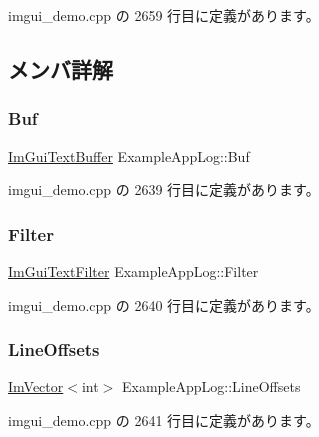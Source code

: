 imgui\+\_\+demo.\+cpp の 2659 行目に定義があります。



\subsection{メンバ詳解}
\mbox{\label{struct_example_app_log_a74fb7cd7bd8c2507b41331ebb7d0e56d}} 
\subsubsection{\texorpdfstring{Buf}{Buf}}
{\footnotesize\ttfamily \mbox{\hyperlink{struct_im_gui_text_buffer}{Im\+Gui\+Text\+Buffer}} Example\+App\+Log\+::\+Buf}



 imgui\+\_\+demo.\+cpp の 2639 行目に定義があります。

\mbox{\label{struct_example_app_log_a4571947a6000e984ec8da9b7166e1e2b}} 
\subsubsection{\texorpdfstring{Filter}{Filter}}
{\footnotesize\ttfamily \mbox{\hyperlink{struct_im_gui_text_filter}{Im\+Gui\+Text\+Filter}} Example\+App\+Log\+::\+Filter}



 imgui\+\_\+demo.\+cpp の 2640 行目に定義があります。

\mbox{\label{struct_example_app_log_af197fca7116f9033a5a5e831ee764ee2}} 
\subsubsection{\texorpdfstring{Line\+Offsets}{LineOffsets}}
{\footnotesize\ttfamily \mbox{\hyperlink{class_im_vector}{Im\+Vector}}$<$int$>$ Example\+App\+Log\+::\+Line\+Offsets}



 imgui\+\_\+demo.\+cpp の 2641 行目に定義があります。

